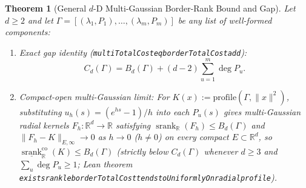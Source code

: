 \documentclass[11pt,a4paper]{article}
\theoremstyle{plain}
\newtheorem{theorem}{Theorem}[section]
\theoremstyle{definition}
\newcommand{\R}{\mathbb{R}}
\DeclareMathOperator{\srank}{srank}
\DeclareRobustCommand{\leanid}[1]{{\def\_{\textunderscore\allowbreak}\texttt{#1}}}
\begin{document}
\begin{theorem}[General $d$-D Multi-Gaussian Border-Rank Bound and Gap]\label{thm:border_general}
Let $d \ge 2$ and let $\Gamma = [(\lambda_1, P_1), \dots, (\lambda_m, P_m)]$ be any list of well-formed components:
\begin{enumerate}[leftmargin=2em,itemsep=2pt]
  \item \emph{Exact gap identity} (\leanid{multiTotalCost\_eq\_borderTotalCost\_add}):
  \begin{equation}\label{eq:border_gap_id}
    C_d(\Gamma) = B_d(\Gamma) + (d - 2)\sum_{u=1}^m \deg P_u.
  \end{equation}
  \item \emph{Compact-open multi-Gaussian limit:} For $K(x) := \mathrm{profile}(\Gamma, \|x\|^2)$, substituting $u_h(s) = (e^{hs} - 1)/h$ into each $P_u(s)$ gives multi-Gaussian radial kernels $F_h : \R^d \to \R$ satisfying $\srank_{\R}(F_h) \le B_d(\Gamma)$ and $\|F_h - K\|_{E,\infty} \to 0$ as $h \to 0$ ($h \ne 0$) on every compact $E \subset \R^d$, so $\underline{\srank}_{\R}^{\mathrm{co}}(K) \le B_d(\Gamma)$ (strictly below $C_d(\Gamma)$ whenever $d \ge 3$ and $\sum_u \deg P_u \ge 1$; Lean theorem \leanid{exists\_rank\_le\_border\allowbreak Total\allowbreak Cost\_tendsto\allowbreak Uniformly\allowbreak On\_radial\_profile}).
\end{enumerate}
\end{theorem}
\end{document}
